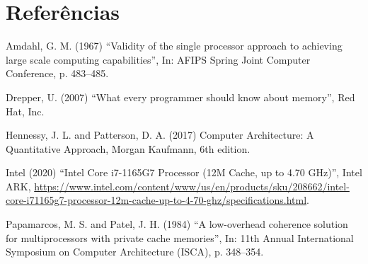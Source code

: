 \documentclass[12pt,a4paper]{article}
\begin{document}
\section*{Referências}
\begin{list}{}{\leftmargin=0.5cm\itemindent=-0.5cm\setlength{\itemsep}{6pt}\setlength{\parsep}{0pt}\setlength{\topsep}{0pt}}
\item Amdahl, G. M. (1967) ``Validity of the single processor approach to achieving large scale computing capabilities'', In: AFIPS Spring Joint Computer Conference, p. 483--485.
\item Drepper, U. (2007) ``What every programmer should know about memory'', Red Hat, Inc.
\item Hennessy, J. L. and Patterson, D. A. (2017) Computer Architecture: A Quantitative Approach, Morgan Kaufmann, 6th edition.
\item Intel (2020) ``Intel Core i7-1165G7 Processor (12M Cache, up to 4.70 GHz)'', Intel ARK, \url{https://www.intel.com/content/www/us/en/products/sku/208662/intel-core-i71165g7-processor-12m-cache-up-to-4-70-ghz/specifications.html}.
\item Papamarcos, M. S. and Patel, J. H. (1984) ``A low-overhead coherence solution for multiprocessors with private cache memories'', In: 11th Annual International Symposium on Computer Architecture (ISCA), p. 348--354.
\end{list}
\end{document}
